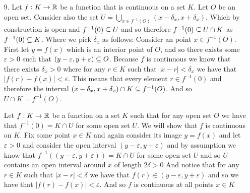 \documentclass[12pt]{amsart}
\begin{document}
\begin{itemize}
    \item[9.] %
    Let $f:K\rightarrow\mathbb{R}$ be a function that is continuous on a set $K$. Let $O$ be an open set.
               Consider also the set $U=\bigcup_{x\in f^{-1}(O)}(x-\delta_x,x+\delta_x)$. Which by construction is open and $f^{-1}(0)\subseteq U$ and so therefore
               $f^{-1}(0)\subseteq U\cap K$ as $f^{-1}(0)\subseteq K$.
               Where we pick $\delta_x$ as follows: 
               Consider an point $x\in f^{-1}(O)$. First let $y=f(x)$
               which is an interior point of $O$, and so there exists some $\varepsilon>0$ 
               such that $(y-\varepsilon, y+\varepsilon)\subseteq O$. Because $f$ is continuous we know that there exists $\delta_x>0$ 
               where for any $r\in K$ such that $|x-r|<\delta_x$ we have that $|f(r)-f(x)|<\varepsilon$. This means that every element $r\in f^{-1}(0)$
               and therefore the interval $(x-\delta_x,x+\delta_x)\cap K\subseteq f^{-1}(O)$. And so $U\cap K= f^{-1}(O)$.

               Let $f:K\rightarrow\mathbb{R}$ be a function on a set $K$ such that for any open set $O$ we have that $f^{-1}(0)=K\cap U$ for some open set $U$.
               We will show that $f$ is continuous on $K$. Fix some point $x\in K$ and again consider its image $y=f(x)$ and let 
               $\varepsilon>0$ and consider the open interval $(y-\varepsilon, y+\varepsilon)$ and by assumption we know that 
               $f^{-1}((y-\varepsilon, y+\varepsilon))=K\cap U$ for some open set $U$ and so $U$ 
               contains an open interval around $x$ of length $2\delta>0$
               And notice that for any $r\in K$ such that $|x-r|<\delta$ we have that $f(r)\in(y-\varepsilon, y+\varepsilon)$ and so
               we have that $|f(r)-f(x)|<\varepsilon$. And so $f$ is continuous at all points $x\in K$

\end{itemize}
\end{document}
